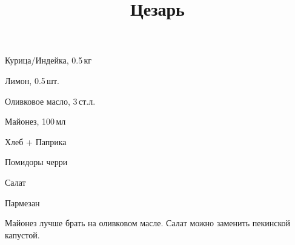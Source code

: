 
\title{Цезарь}

\begin{ingredient}
\begin{main}
	\item Курица/Индейка, 0.5\,кг
	\item Лимон, 0.5\,шт.
	\item Оливковое масло, 3\,ст.л.
	\item Майонез, 100\,мл
	\item Хлеб + Паприка
	\item Помидоры черри
	\item Салат
	\item Пармезан
\end{main}
\end{ingredient}
\begin{recipe}
\setcounter{step}{0}

\end{recipe}

\begin{notes}
	Майонез лучше брать на оливковом масле. Салат можно заменить пекинской капустой.
\end{notes}	